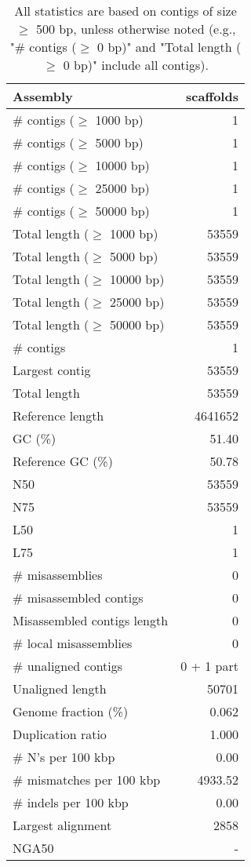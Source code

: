 \documentclass[12pt,a4paper]{article}
\begin{document}
\begin{table}[ht]
\begin{center}
\caption{All statistics are based on contigs of size $\geq$ 500 bp, unless otherwise noted (e.g., "\# contigs ($\geq$ 0 bp)" and "Total length ($\geq$ 0 bp)" include all contigs).}
\begin{tabular}{|l*{1}{|r}|}
\hline
Assembly & scaffolds \\ \hline
\# contigs ($\geq$ 1000 bp) & 1 \\ \hline
\# contigs ($\geq$ 5000 bp) & 1 \\ \hline
\# contigs ($\geq$ 10000 bp) & 1 \\ \hline
\# contigs ($\geq$ 25000 bp) & 1 \\ \hline
\# contigs ($\geq$ 50000 bp) & 1 \\ \hline
Total length ($\geq$ 1000 bp) & 53559 \\ \hline
Total length ($\geq$ 5000 bp) & 53559 \\ \hline
Total length ($\geq$ 10000 bp) & 53559 \\ \hline
Total length ($\geq$ 25000 bp) & 53559 \\ \hline
Total length ($\geq$ 50000 bp) & 53559 \\ \hline
\# contigs & 1 \\ \hline
Largest contig & 53559 \\ \hline
Total length & 53559 \\ \hline
Reference length & 4641652 \\ \hline
GC (\%) & 51.40 \\ \hline
Reference GC (\%) & 50.78 \\ \hline
N50 & 53559 \\ \hline
N75 & 53559 \\ \hline
L50 & 1 \\ \hline
L75 & 1 \\ \hline
\# misassemblies & 0 \\ \hline
\# misassembled contigs & 0 \\ \hline
Misassembled contigs length & 0 \\ \hline
\# local misassemblies & 0 \\ \hline
\# unaligned contigs & 0 + 1 part \\ \hline
Unaligned length & 50701 \\ \hline
Genome fraction (\%) & 0.062 \\ \hline
Duplication ratio & 1.000 \\ \hline
\# N's per 100 kbp & 0.00 \\ \hline
\# mismatches per 100 kbp & 4933.52 \\ \hline
\# indels per 100 kbp & 0.00 \\ \hline
Largest alignment & 2858 \\ \hline
NGA50 & - \\ \hline
\end{tabular}
\end{center}
\end{table}
\end{document}

